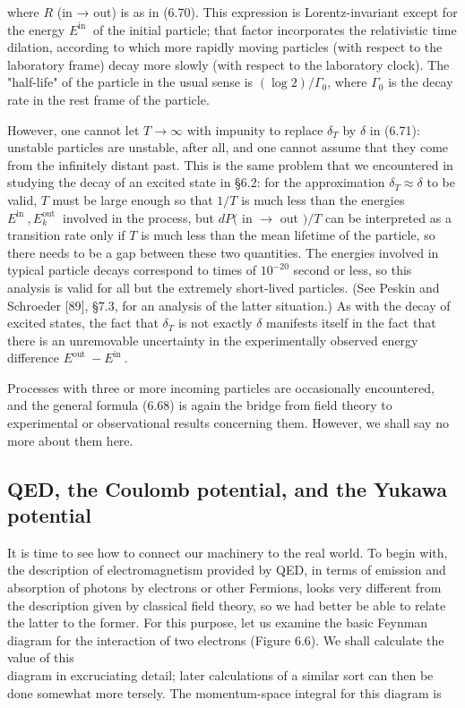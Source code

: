 \documentclass[10pt, letterpaper]{article}
\begin{document}
where $R$ (in → out) is as in (6.70). This expression is Lorentz-invariant except for the energy $E^{\text {in }}$ of the initial particle; that factor incorporates the relativistic time dilation, according to which more rapidly moving particles (with respect to the laboratory frame) decay more slowly (with respect to the laboratory clock). The "half-life" of the particle in the usual sense is $(\log 2) / \Gamma_{0}$, where $\Gamma_{0}$ is the decay rate in the rest frame of the particle.

However, one cannot let $T \rightarrow \infty$ with impunity to replace $\delta_{T}$ by $\delta$ in (6.71): unstable particles are unstable, after all, and one cannot assume that they come from the infinitely distant past. This is the same problem that we encountered in studying the decay of an excited state in §6.2: for the approximation $\delta_{T} \approx \delta$ to be valid, $T$ must be large enough so that $1 / T$ is much less than the energies $E^{\text {in }}, E_{k}^{\text {out }}$ involved in the process, but $d P($ in $\rightarrow$ out $) / T$ can be interpreted as a transition rate only if $T$ is much less than the mean lifetime of the particle, so there needs to be a gap between these two quantities. The energies involved in typical particle decays correspond to times of $10^{-20}$ second or less, so this analysis is valid for all but the extremely short-lived particles. (See Peskin and Schroeder [89], §7.3, for an analysis of the latter situation.) As with the decay of excited states, the fact that $\delta_{T}$ is not exactly $\delta$ manifests itself in the fact that there is an unremovable uncertainty in the experimentally observed energy difference $E^{\text {out }}-E^{\text {in }}$.

Processes with three or more incoming particles are occasionally encountered, and the general formula (6.68) is again the bridge from field theory to experimental or observational results concerning them. However, we shall say no more about them here.

\subsection*{QED, the Coulomb potential, and the Yukawa potential}
It is time to see how to connect our machinery to the real world. To begin with, the description of electromagnetism provided by QED, in terms of emission and absorption of photons by electrons or other Fermions, looks very different from the description given by classical field theory, so we had better be able to relate the latter to the former. For this purpose, let us examine the basic Feynman diagram for the interaction of two electrons (Figure 6.6). We shall calculate the value of this\\
diagram in excruciating detail; later calculations of a similar sort can then be done somewhat more tersely. The momentum-space integral for this diagram is
\end{document}
